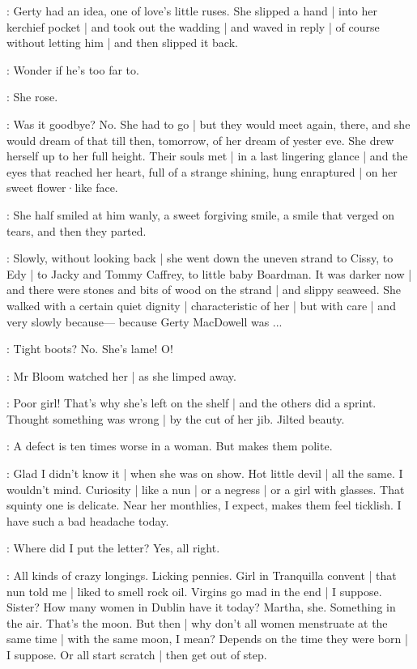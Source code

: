 \gertyNovel:
Gerty had an idea,
one of love's little ruses.
She slipped a hand |
into her kerchief pocket |
and took out the wadding |
and waved in reply |
of course 
without letting him |
and then slipped it back.

\gertySex:
Wonder if he's too far to.

\gertyNovel:
She rose.

\gertyRomantic:
Was it goodbye?%
No.
She had to go |
but they would meet again,
there,
and she would dream of that till then,
tomorrow,
of her dream of yester eve.
She drew herself up to her full height.
Their souls met |
in a last lingering glance |
and the eyes that reached her heart,
full of a strange shining,
hung enraptured |
on her sweet flower·like face.

\gertyNovel:
She half smiled at him wanly,
a sweet forgiving smile,
a smile that verged on tears,
and then they parted.

:
Slowly,
without looking back |
she went down the uneven strand to Cissy,
to Edy |
to Jacky and Tommy Caffrey,
to little baby Boardman.
It was darker now |
and there were stones and bits of wood on the strand |
and slippy seaweed.
She walked with a certain quiet dignity |
characteristic of her |
but with care |%
and very slowly because—%
because Gerty MacDowell was ...

\BloomInt:
Tight boots?
No.
She's lame!
O!

:
Mr Bloom watched her |
as she limped away.

\BloomCurrent:
Poor girl!
That's why
she's left on the shelf |
and the others did a sprint.
Thought something was wrong |
by the cut of her jib.
Jilted beauty.

\BloomAbstract:
A defect is ten times worse in a woman.
But makes them polite.

\BloomCurrent:
Glad I didn't know it |
when she was on show.
Hot little devil |
all the same.
I wouldn't mind.
Curiosity |
like a nun |
or a negress |
or a girl with glasses.
That squinty one is delicate.
Near her monthlies,
I expect,
makes them feel ticklish.
I have such a bad headache today.

\BloomToday:
Where did I put the letter?
Yes,
all right.

\BloomAbstract:
All kinds of crazy longings.
Licking pennies.%
Girl in Tranquilla convent |
that nun told me |
liked to smell rock oil.
Virgins go mad in the end |
I suppose.
Sister?
How many women in Dublin have it today?
Martha,
she.
Something in the air.
That's the moon.
But then |
why don't all women menstruate
at the same time |
with the same moon,
I mean?
Depends on the time they were born |
I suppose.
Or all start scratch |
then get out of step.

